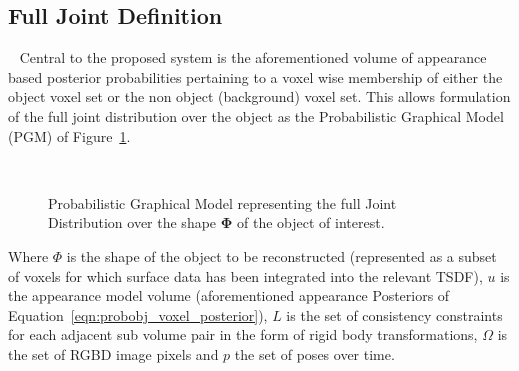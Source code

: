 \subsection{Full Joint Definition}
~\label{subsec:probobj_full_joint}
Central to the proposed system is the aforementioned volume of appearance based
posterior probabilities pertaining to a voxel wise membership of either the
object voxel set or the non object (background) voxel set. This allows
formulation of the full joint distribution over the object as the Probabilistic
Graphical Model (PGM) of Figure~\ref{figure:probobj_pgm1}.
\begin{figure}[!htbp]
  \centering
  \caption[Probabilistic Object Reconstruction Formulation I]
  {Probabilistic Graphical Model representing the full Joint
    Distribution over the shape \(\bm{\Phi}\) of the object of interest.}
~\label{figure:probobj_pgm1}
\end{figure}

Where \( \Phi \) is the shape of the object to be reconstructed (represented as a
subset of voxels for which surface data has been integrated into the relevant
TSDF), \(u\) is the appearance model volume (aforementioned appearance Posteriors 
of Equation~\ref{eqn:probobj_voxel_posterior}), \(L\) is the set of consistency 
constraints for each adjacent sub volume pair in the form of rigid body 
transformations, \( \Omega \) is the set of RGBD image pixels and \(p\) the set of 
poses over time.

